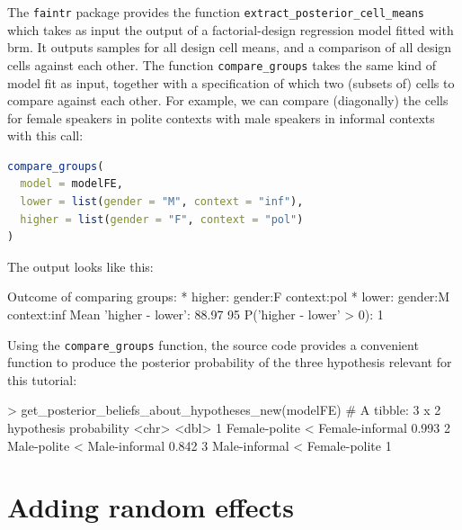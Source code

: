 \documentclass[nobib]{tufte-handout}
\begin{document}
The \texttt{faintr} package provides the function \texttt{extract\_posterior\_cell\_means}
which takes as input the output of a factorial-design regression model fitted with
\textrm{brm}. It outputs samples for all design cell means, and a comparison of all design
cells against each other. The function \texttt{compare\_groups} takes the same kind of model
fit as input, together with a specification of which two (subsets of) cells to compare against
each other. For example, we can compare (diagonally) the cells for female speakers in polite
contexts with male speakers in informal contexts with this call:

\begin{minipage}[]{1.3\textwidth}
\begin{lstlisting}[language=R]
compare_groups(
  model = modelFE, 
  lower = list(gender = "M", context = "inf"),
  higher = list(gender = "F", context = "pol")
)
\end{lstlisting}
\end{minipage}

The output looks like this:

\medskip

\begin{minipage}[]{\textwidth}
\begin{rc}
Outcome of comparing groups:
 * higher:  gender:F context:pol 
 * lower:   gender:M context:inf 
Mean 'higher - lower':  88.97 
95%
P('higher - lower' > 0):  1 
\end{rc}
\end{minipage}

Using the \texttt{compare\_groups} function, the source code provides a convenient function to
produce the posterior probability of the three hypothesis relevant for this tutorial:

\medskip

\begin{minipage}[]{\textwidth}
\begin{rc}
> get_posterior_beliefs_about_hypotheses_new(modelFE)
# A tibble: 3 x 2
  hypothesis                      probability
  <chr>                                 <dbl>
1 Female-polite < Female-informal       0.993
2 Male-polite < Male-informal           0.842
3 Male-informal < Female-polite         1  
\end{rc}
\end{minipage}

\section{Adding random effects}
\end{document}
